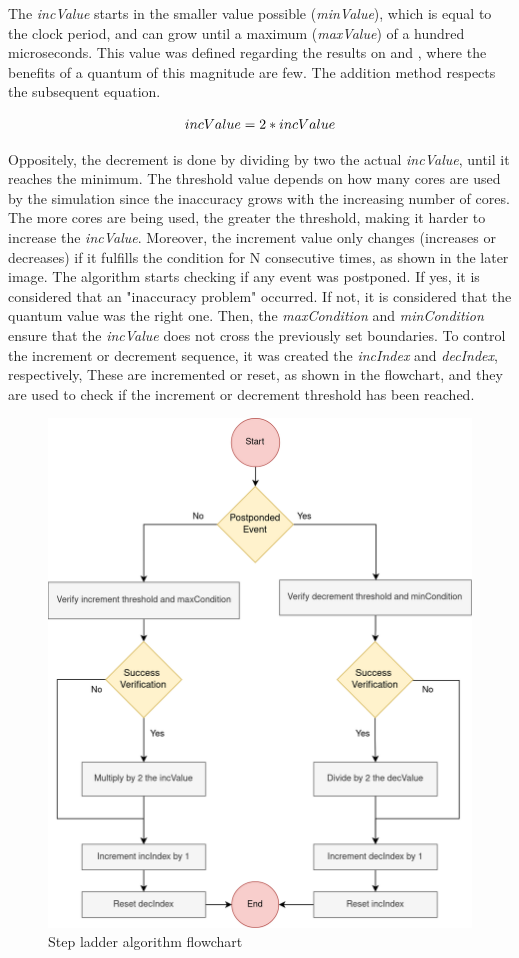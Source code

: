 The \textit{incValue} starts in the smaller value possible (\textit{minValue}), which is equal to the clock period, 
and can grow until a maximum (\textit{maxValue}) of a hundred microseconds.  
This value was defined regarding the results on \cite{pargem5} and \cite{BeyondQuantumTDSim}, where the benefits of a 
quantum of this magnitude are few. The addition method respects the subsequent equation.

\begin{equation}
    \label{eq_incValue}
    \centering
        \Large
        incValue = 2 * incValue
        \normalsize
\end{equation}
\vspace{0.3cm}

Oppositely, the decrement is done by dividing by two the actual \textit{incValue}, until it reaches the minimum. The threshold value depends on how 
many cores are used by the simulation since the inaccuracy grows with the increasing number of cores. The more cores are being used, the greater 
the threshold, making it harder to increase the \textit{incValue}. Moreover, the increment value only changes (increases or decreases) if it 
fulfills the condition for N consecutive times, as shown in the later image. The algorithm starts checking if any event 
was postponed. If yes, it is considered that an "inaccuracy problem" occurred. If not, it is considered that the quantum value was the right one.
Then, the \textit{maxCondition} and \textit{minCondition} ensure that the \textit{incValue} does not cross the previously set boundaries. To control the 
increment or decrement sequence, it was created the \textit{incIndex} and \textit{decIndex}, respectively, These are incremented or reset, as 
shown in the flowchart, and they are used to check if the increment or decrement threshold has been reached.

\begin{figure}[H]
	\centering
 	\includegraphics[width=0.6\linewidth]{Images/incAlgorithm_flowchart.png}
 	\caption{Step ladder algorithm flowchart}
	 \label{fig_incAlgorithm_flowchart}
\end{figure}

